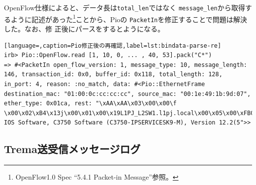 OpenFlow仕様によると、データ長は\verb|total_len|ではなく
\verb|message_len|から取得するように記述があった\footnote{OpenFlow1.0
Spec\cite{of10spec} ``5.4.1 Packet-in Message''参照。}ことから、Pioの
\verb|PacketIn|を修正することで問題は解決した\cite{pio-pr320}。なお、修
正後にパースをするとようになる。

\begin{lstlisting}[language=,caption=Pio修正後の再確認,label=lst:bindata-parse-re]
irb> Pio::OpenFlow.read [1, 10, 0, ... , 40, 53].pack("C*")
=> #<PacketIn open_flow_version: 1, message_type: 10, message_length: 146, transaction_id: 0x0, buffer_id: 0x118, total_length: 128, in_port: 4, reason: :no_match, data: #<Pio::EthernetFrame destination_mac: "01:00:0c:cc:cc:cc", source_mac: "00:1e:49:1b:9d:07", ether_type: 0x01ca, rest: "\xAA\xAA\x03\x00\x00\f \x00\x02\xB4\x13j\x00\x01\x00\x19L1PJ_L2SW1.l1pj.local\x00\x05\x00\xFBCisco IOS Software, C3750 Software (C3750-IPSERVICESK9-M), Version 12.2(5">>
\end{lstlisting}

  \subsection{Trema送受信メッセージログ}


